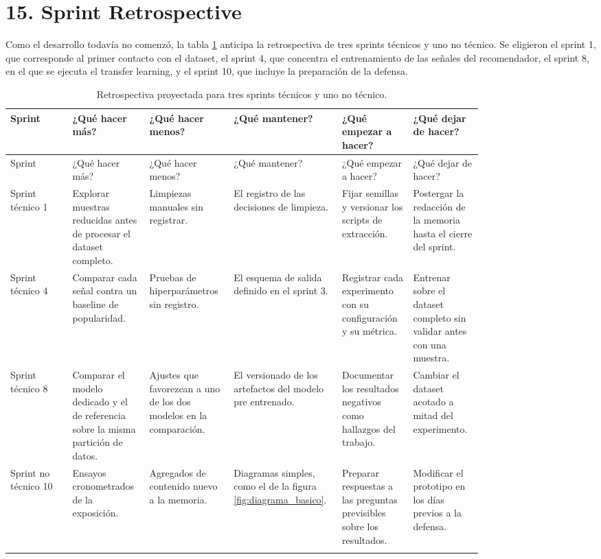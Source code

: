 \documentclass[
11pt, %
]{charter}
\begin{document}
\section{15. Sprint Retrospective}
\label{sec:sprint_retro}

Como el desarrollo todavía no comenzó, la tabla \ref{tab:sprintRetro} anticipa la retrospectiva de tres sprints técnicos y uno no técnico. Se eligieron el sprint 1, que corresponde al primer contacto con el dataset, el sprint 4, que concentra el entrenamiento de las señales del recomendador, el sprint 8, en el que se ejecuta el transfer learning, y el sprint 10, que incluye la preparación de la defensa.

\begin{longtable}{|>{\raggedright\arraybackslash}p{0.12\linewidth}|>{\raggedright\arraybackslash}p{0.135\linewidth}|>{\raggedright\arraybackslash}p{0.135\linewidth}|>{\raggedright\arraybackslash}p{0.135\linewidth}|>{\raggedright\arraybackslash}p{0.135\linewidth}|>{\raggedright\arraybackslash}p{0.135\linewidth}|}
\hline
\rowcolor[HTML]{C0C0C0}
Sprint & ¿Qué hacer más? & ¿Qué hacer menos? & ¿Qué mantener? & ¿Qué empezar a hacer? & ¿Qué dejar de hacer? \\ \hline
\endfirsthead
\hline
\rowcolor[HTML]{C0C0C0}
Sprint & ¿Qué hacer más? & ¿Qué hacer menos? & ¿Qué mantener? & ¿Qué empezar a hacer? & ¿Qué dejar de hacer? \\ \hline
\endhead
Sprint técnico 1 & Explorar muestras reducidas antes de procesar el dataset completo. & Limpiezas manuales sin registrar. & El registro de las decisiones de limpieza. & Fijar semillas y versionar los scripts de extracción. & Postergar la redacción de la memoria hasta el cierre del sprint. \\ \hline
Sprint técnico 4 & Comparar cada señal contra un baseline de popularidad. & Pruebas de hiperparámetros sin registro. & El esquema de salida definido en el sprint 3. & Registrar cada experimento con su configuración y su métrica. & Entrenar sobre el dataset completo sin validar antes con una muestra. \\ \hline
Sprint técnico 8 & Comparar el modelo dedicado y el de referencia sobre la misma partición de datos. & Ajustes que favorezcan a uno de los dos modelos en la comparación. & El versionado de los artefactos del modelo pre entrenado. & Documentar los resultados negativos como hallazgos del trabajo. & Cambiar el dataset acotado a mitad del experimento. \\ \hline
Sprint no técnico 10 & Ensayos cronometrados de la exposición. & Agregados de contenido nuevo a la memoria. & Diagramas simples, como el de la figura \ref{fig:diagrama_basico}. & Preparar respuestas a las preguntas previsibles sobre los resultados. & Modificar el prototipo en los días previos a la defensa. \\ \hline
\caption{Retrospectiva proyectada para tres sprints técnicos y uno no técnico.}
\label{tab:sprintRetro}
\end{longtable}
\end{document}
